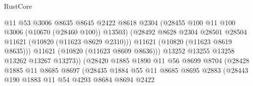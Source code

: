 \begin{lexlean}{RustCore}
\begin{coremodule}
                                          @11
                                          @53
                                          @3006
                                          @8635
                                          @8645
                                          @2422
                                          @8618
                                          @2304
                                          (@28455 @100 @11 @100 @3006 (@10670 (@28460 @100)) @13503)
                                          (@28492
                                            @8628
                                            @2304
                                            @28501
                                            @28504
                                            @11621
                                            (@10820 (@11623 @8629 @2310)))
                                          @11621
                                          (@10820 (@11623 @8619 @8635)))
                                        @11621
                                        (@10820 (@11623 @8609 @8636)))
                                      @13252
                                      @13255
                                      @13258
                                      @13262
                                      @13267
                                      @13273))
                                  (@28420
                                    @1885
                                    @1890
                                    @11
                                    @56
                                    @8699
                                    @8704
                                    (@28428
                                      @1885
                                      @11
                                      @8685
                                      @8697
                                      (@28435
                                        @1884
                                        @55
                                        @11
                                        @8685
                                        @8695
                                        @2883
                                        (@28443
                                          @190
                                          @1883
                                          @11
                                          @54
                                          @4293
                                          @8684
                                          @8694
                                          @2422

\end{coremodule}
\end{lexlean}

